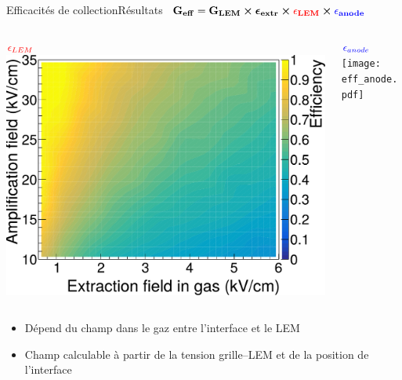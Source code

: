     \begin{frame}{Efficacités de collection}{Résultats}
        \hbox{
        		$\mathbf{G_{eff}=G_{LEM}\boldsymbol{\times}\boldsymbol{\epsilon}_{extr} \boldsymbol{\times}\textcolor{red}{\epsilon_{LEM}}\boldsymbol{\times} \textcolor{blue}{\epsilon_{anode}}}$
        	}\vspace{0.2cm}
      		\begin{columns}
            \begin{column}{0.5\textwidth}
                \centering $\textcolor{red}{\epsilon_{LEM}}$
                \includegraphics[width=\textwidth]{./pictures/eff_lem_alone.pdf}
            \end{column}\hfill
            \begin{column}{0.5\textwidth}
                \centering $\textcolor{blue}{\epsilon_{anode}}$
                \texttt{[image: eff\_anode.pdf]}
            \end{column}
        \end{columns}
      		\begin{columns}
            \begin{column}{0.5\textwidth}
                \begin{scriptsize}
                    \begin{itemize}
                        \item Dépend du champ dans le gaz entre l'interface et le LEM
                        \item Champ calculable à partir de la tension grille--LEM et de la position de l'interface
                    \end{itemize}

\end{scriptsize}
\end{column}
\end{columns}
\end{frame}
